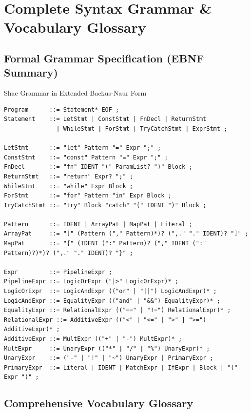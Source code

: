 \chapter{Complete Syntax Grammar \& Vocabulary Glossary}

\section{Formal Grammar Specification (EBNF Summary)}

\begin{syntaxbox}{Shae Grammar in Extended Backus-Naur Form}
\begin{lstlisting}[language=shaelang]
Program      ::= Statement* EOF ;
Statement    ::= LetStmt | ConstStmt | FnDecl | ReturnStmt 
               | WhileStmt | ForStmt | TryCatchStmt | ExprStmt ;

LetStmt      ::= "let" Pattern "=" Expr ";" ;
ConstStmt    ::= "const" Pattern "=" Expr ";" ;
FnDecl       ::= "fn" IDENT "(" ParamList? ")" Block ;
ReturnStmt   ::= "return" Expr? ";" ;
WhileStmt    ::= "while" Expr Block ;
ForStmt      ::= "for" Pattern "in" Expr Block ;
TryCatchStmt ::= "try" Block "catch" "(" IDENT ")" Block ;

Pattern      ::= IDENT | ArrayPat | MapPat | Literal ;
ArrayPat     ::= "[" (Pattern ("," Pattern)*)? (",." "." IDENT)? "]" ;
MapPat       ::= "{" (IDENT (":" Pattern)? ("," IDENT (":" Pattern)?)*)? (",." "." IDENT)? "}" ;

Expr         ::= PipelineExpr ;
PipelineExpr ::= LogicOrExpr ("|>" LogicOrExpr)* ;
LogicOrExpr  ::= LogicAndExpr (("or" | "||") LogicAndExpr)* ;
LogicAndExpr ::= EqualityExpr (("and" | "&&") EqualityExpr)* ;
EqualityExpr ::= RelationalExpr (("==" | "!=") RelationalExpr)* ;
RelationalExpr ::= AdditiveExpr (("<" | "<=" | ">" | ">=") AdditiveExpr)* ;
AdditiveExpr ::= MultExpr (("+" | "-") MultExpr)* ;
MultExpr     ::= UnaryExpr (("*" | "/" | "%") UnaryExpr)* ;
UnaryExpr    ::= ("-" | "!" | "~") UnaryExpr | PrimaryExpr ;
PrimaryExpr  ::= Literal | IDENT | MatchExpr | IfExpr | Block | "(" Expr ")" ;
\end{lstlisting}
\end{syntaxbox}

\section{Comprehensive Vocabulary Glossary}

